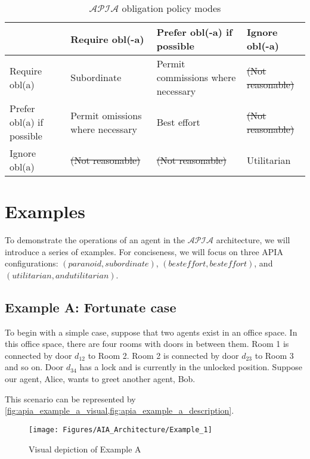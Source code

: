 \begin{table}[h]
    \centering
    \begin{tabularx}{\textwidth}{ | X | X | X | X | }
        \hline
        & Require obl(-a) & Prefer obl(-a) if possible & Ignore obl(-a) \\
        \hline
        Require obl(a) & Subordinate & Permit commissions where necessary & \sout{(Not reasonable)} \\
        \hline
        Prefer obl(a) if possible & Permit omissions where necessary & Best effort & \sout{(Not reasonable)} \\
        \hline
        Ignore obl(a) & \sout{(Not reasonable)} & \sout{(Not reasonable)} & Utilitarian \\
        \hline
    \end{tabularx}
    \caption{$\mathcal{APIA}$ obligation policy modes}
    \label{table:apia_obligation_modes}
\end{table}

\section{Examples}

To demonstrate the operations of an agent in the $\mathcal{APIA}$ architecture, we will introduce a series of examples.
For conciseness, we will focus on three APIA configurations: $(paranoid, subordinate)$, $(best effort, best effort)$, and $(utilitarian, and utilitarian)$.

\subsection{Example A: Fortunate case}

To begin with a simple case, suppose that two agents exist in an office space.
In this office space, there are four rooms with doors in between them.
Room 1 is connected by door $d_{12}$ to Room 2.
Room 2 is connected by door $d_{23}$ to Room 3 and so on.
Door $d_{34}$ has a lock and is currently in the unlocked position.
Suppose our agent, Alice, wants to greet another agent, Bob.

This scenario can be represented by \cref{fig:apia_example_a_visual,fig:apia_example_a_description}.

\begin{figure}[h]
    \centering
    \texttt{[image: Figures/AIA\_Architecture/Example\_1]}
    \caption{Visual depiction of Example A}
    \label{fig:apia_example_a_visual}
\end{figure}

